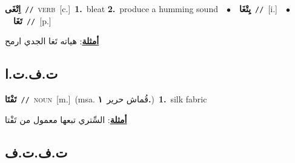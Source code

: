 \documentclass[10pt,a4paper,twoside]{article} %
\begin{document}
\begin{multicols}{2}
{{{{{{{{{{{{\setlength\topsep{0pt}\textbf{\foreignlanguage{arabic}{اِتْغَى}}\ {\color{gray}\texttt{//}\color{black}}\ \textsc{verb}\ [c.]\ \textbf{1.}~bleat  \textbf{2.}~produce a humming sound\ \ $\bullet$\ \ \setlength\topsep{0pt}\textbf{\foreignlanguage{arabic}{يِتْغَا}}\ {\color{gray}\texttt{//}\color{black}}\ [i.]\ \ $\bullet$\ \ \setlength\topsep{0pt}\textbf{\foreignlanguage{arabic}{تَغَا}}\ {\color{gray}\texttt{//}\color{black}}\ [p.]\  \begin{flushright}\color{gray}\foreignlanguage{arabic}{\textbf{\underline{\foreignlanguage{arabic}{أمثلة}}}: هياته تَغا الجدي ارمح}\end{flushright}\color{black}} \vspace{2mm}

\vspace{-3mm}
\subsection*{\color{blue}\foreignlanguage{arabic}{ت.ف.ت.ا}\color{blue}{ (ntws)}} 

{\setlength\topsep{0pt}\textbf{\foreignlanguage{arabic}{تَفْتَا}}\ {\color{gray}\texttt{//}\color{black}}\ \textsc{noun}\ [m.]\ \color{gray}(msa. \foreignlanguage{arabic}{قُماش حرير}~\foreignlanguage{arabic}{\textbf{١.}})\color{black}\ \textbf{1.}~silk fabric\  \begin{flushright}\color{gray}\foreignlanguage{arabic}{\textbf{\underline{\foreignlanguage{arabic}{أمثلة}}}: السِّتري تبعها معمول من تَفْتا}\end{flushright}\color{black}} \vspace{2mm}

\vspace{-3mm}
\subsection*{\color{blue}\foreignlanguage{arabic}{ت.ف.ت.ف}\color{blue}{}} 

}}}}}}}}}}}
\end{multicols}
\end{document}
